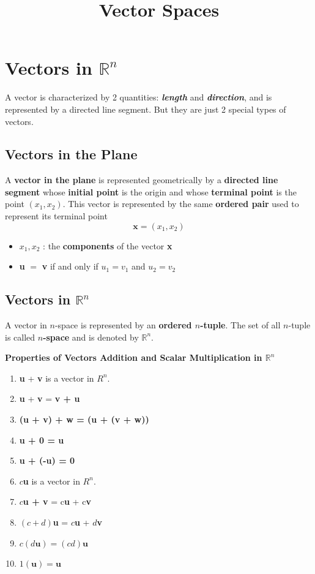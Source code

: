 \documentclass{article}
\title{Vector Spaces}
\date{}
\newcommand\B{\textbf}
\newcommand\tcl{\begin{tcolorbox}[colback = {blue9}]}
\newcommand\etcl{\end{tcolorbox}}
\begin{document}
    \section{Vectors in $\mathbb{R}^n$}
        
    A vector is characterized by 2 quantities: \textit{\B{length}} and \textit{\B{direction}}, and is represented by a directed line
    segment. But they are just 2 special types of vectors.

    \subsection{Vectors in the Plane}

    A \B{vector in the plane} is represented geometrically by a \B{directed line segment} whose \B{initial point}
    is the origin and whose \B{terminal point} is the point $(x_1, x_2)$. This vector is represented by the same 
    \B{ordered pair} used to represent its terminal point
    \[ \textbf{x} = (x_1, x_2)\]
    \begin{itemize}
        \item $x_1, x_2$ : the \B{components} of the vector \B{x}
        \item \B{u} $=$ \B{v} if and only if $u_1 = v_1$ and $u_2 = v_2$
    \end{itemize}

    \subsection{Vectors in $\mathbb{R}^n$}

    A vector in $n$-space is represented by an \B{ordered $n$-tuple}. The set of all $n$-tuple is called \B{$n$-space}
    and is denoted by $\mathbb{R}^n$.

    \tcl
    \B{Properties of Vectors Addition and Scalar Multiplication in $\mathbb{R}^n$}
    \begin{enumerate}
        \item \B{u} + \B{v} is a vector in $R^n$.
        \item \B{u}  + \B{v} = \B{v + u}
        \item \B{(u + v) + w = (u + (v + w))}
        \item \B{u + 0 = u}
        \item \B{u + (-u) = 0}
        \item $c$\B{u} is a vector in $R^n$.
        \item $c$\B{u + v} = c\B{u} + c\B{v}
        \item $(c + d)$\B{u} = $c$\B{u} + $d$\B{v}
        \item $c(d\B{u}) = (cd)\B{u}$
        \item $1(\B{u}) = \B{u}$
    \end{enumerate}
    \etcl
\end{document}
